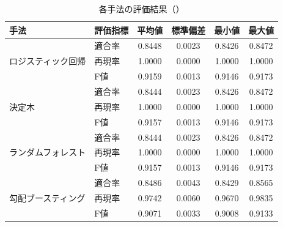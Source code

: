 \begin{table}[tb]
    \caption{各手法の評価結果（\testsecond）}
    \label{tab:all_single_metrics_prospect_task1}
    \centering
    \begin{tabular}{llcccc}
        \hline
        手法 & 評価指標 & 平均値 & 標準偏差 & 最小値 & 最大値 \\\hline \hline
        \multirow{3}{*}{ロジスティック回帰} & 適合率& 0.8448 & 0.0023 & 0.8426 & 0.8472 \\
         & 再現率& 1.0000 & 0.0000 & 1.0000 & 1.0000 \\
         & F値& 0.9159 & 0.0013 & 0.9146 & 0.9173 \\\hline
        \multirow{3}{*}{決定木} & 適合率& 0.8444 & 0.0023 & 0.8426 & 0.8472 \\
         & 再現率& 1.0000 & 0.0000 & 1.0000 & 1.0000 \\
         & F値& 0.9157 & 0.0013 & 0.9146 & 0.9173 \\\hline
        \multirow{3}{*}{ランダムフォレスト} & 適合率& 0.8444 & 0.0023 & 0.8426 & 0.8472 \\
         & 再現率& 1.0000 & 0.0000 & 1.0000 & 1.0000 \\
         & F値& 0.9157 & 0.0013 & 0.9146 & 0.9173 \\\hline
        \multirow{3}{*}{勾配ブースティング} & 適合率& 0.8486 & 0.0043 & 0.8429 & 0.8565 \\
         & 再現率& 0.9742 & 0.0060 & 0.9670 & 0.9835 \\
         & F値& 0.9071 & 0.0033 & 0.9008 & 0.9133 \\\hline
    \end{tabular}
\end{table}
